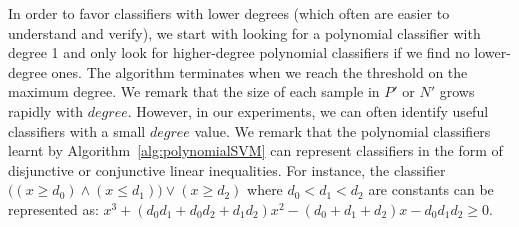 In order to favor classifiers with lower degrees (which often are easier to understand and verify),
we start with looking for a polynomial classifier with degree 1 and only look for higher-degree polynomial classifiers if we find no lower-degree ones.
The algorithm terminates when we reach the threshold on the maximum degree.
We remark that the size of each sample in $P'$ or $N'$ grows rapidly with $\mathit{degree}$.
However, in our experiments, we can often identify useful classifiers with a small $\mathit{degree}$ value.
We remark that the polynomial classifiers learnt by Algorithm~\ref{alg:polynomialSVM} can represent classifiers in the form of disjunctive or conjunctive linear inequalities.
For instance, the classifier $\big((x \ge d_0) \wedge (x \le d_1)\big) \vee (x \ge d_2)$
where $\mathit{d_0 < d_1 < d_2}$ are constants can be represented as: $\mathit{x^3 + (d_0d_1 + d_0d_2 + d_1d_2)x^2 - (d_0 + d_1 + d_2)x - d_0d_1d_2 \geq 0}$.








